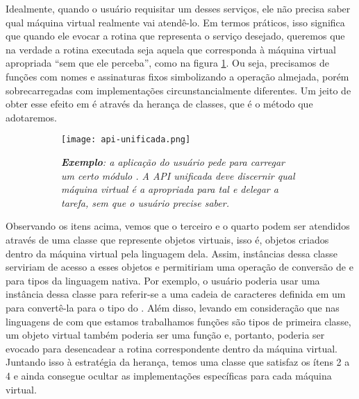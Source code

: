     Idealmente, quando o usuário requisitar um desses serviços, ele não precisa
    saber qual máquina virtual realmente vai atendê-lo. Em termos práticos, isso
    significa que quando ele evocar a rotina que representa o serviço desejado,
    queremos que na verdade a rotina executada seja aquela que corresponda à
    máquina virtual apropriada ``sem que ele perceba'', como na figura
    \ref{fig:api-unificada}. Ou seja, precisamos de funções com nomes e
    assinaturas\footnotemark{} fixos simbolizando a operação almejada, porém
    sobrecarregadas com implementações circunstancialmente diferentes. Um jeito
    de obter esse efeito em \CXX{} é através da herança de classes, que é o
    método que adotaremos.


    \begin{figure}[ht]
      \centering
      \caption{}
      \begin{subfigure}{.8\textwidth}
        \centering
        \texttt{[image: api-unificada.png]}
        \vspace{1em}

        \textit{
          \textbf{Exemplo}: a aplicação do usuário pede para carregar um certo módulo
          \script{}. A API unificada deve discernir qual máquina virtual é a
          apropriada para tal e delegar a tarefa, sem que o usuário precise saber.%
        }
      \end{subfigure}
      \label{fig:api-unificada}
    \end{figure}

    Observando os itens acima, vemos que o terceiro e o quarto podem ser
    atendidos através de uma classe que represente objetos virtuais, isso é,
    objetos criados dentro da máquina virtual pela linguagem dela. Assim,
    instâncias dessa classe serviriam de acesso a esses objetos e permitiriam
    uma operação de conversão de e para tipos da linguagem nativa. Por exemplo,
    o usuário poderia usar uma instância dessa classe para referir-se a uma
    cadeia de caracteres definida em um \script{} para convertê-la para o tipo
     do \CXX{}. Além disso, levando em consideração que nas
    linguagens de \script{} com que estamos trabalhamos funções são tipos de
    primeira classe\footnotemark{}, um objeto virtual também poderia ser uma
    função e, portanto, poderia ser evocado para desencadear a rotina
    correspondente dentro da máquina virtual. Juntando isso à estratégia da
    herança, temos uma classe que satisfaz os ítens 2 a 4 e ainda consegue
    ocultar as implementações específicas para cada máquina virtual.

